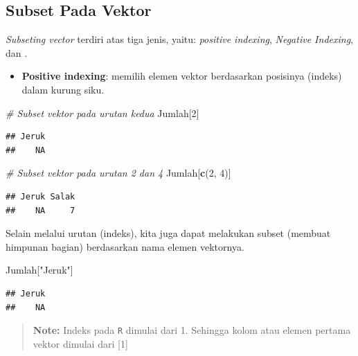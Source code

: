 \documentclass[]{book}
\newenvironment{Shaded}{\begin{snugshade}}{\end{snugshade}}
\newcommand{\KeywordTok}[1]{\textcolor[rgb]{0.13,0.29,0.53}{\textbf{#1}}}
\newcommand{\DecValTok}[1]{\textcolor[rgb]{0.00,0.00,0.81}{#1}}
\newcommand{\StringTok}[1]{\textcolor[rgb]{0.31,0.60,0.02}{#1}}
\newcommand{\CommentTok}[1]{\textcolor[rgb]{0.56,0.35,0.01}{\textit{#1}}}
\newcommand{\NormalTok}[1]{#1}
\providecommand{\tightlist}{%
  \setlength{\itemsep}{0pt}\setlength{\parskip}{0pt}}
\begin{document}
\subsection{Subset Pada Vektor}\label{subset-pada-vektor}

\emph{Subseting vector} terdiri atas tiga jenis, yaitu: \emph{positive
indexing}, \emph{Negative Indexing}, dan .

\begin{itemize}
\tightlist
\item
  \textbf{Positive indexing}: memilih elemen vektor berdasarkan
  posisinya (indeks) dalam kurung siku.
\end{itemize}

\begin{Shaded}
\begin{Highlighting}[]
\CommentTok{# Subset vektor pada urutan kedua}
\NormalTok{Jumlah[}\DecValTok{2}\NormalTok{]}
\end{Highlighting}
\end{Shaded}

\begin{verbatim}
## Jeruk 
##    NA
\end{verbatim}

\begin{Shaded}
\begin{Highlighting}[]
\CommentTok{# Subset vektor pada urutan 2 dan 4}
\NormalTok{Jumlah[}\KeywordTok{c}\NormalTok{(}\DecValTok{2}\NormalTok{, }\DecValTok{4}\NormalTok{)]}
\end{Highlighting}
\end{Shaded}

\begin{verbatim}
## Jeruk Salak 
##    NA     7
\end{verbatim}

Selain melalui urutan (indeks), kita juga dapat melakukan subset
(membuat himpunan bagian) berdasarkan nama elemen vektornya.

\begin{Shaded}
\begin{Highlighting}[]
\NormalTok{Jumlah[}\StringTok{"Jeruk"}\NormalTok{]}
\end{Highlighting}
\end{Shaded}

\begin{verbatim}
## Jeruk 
##    NA
\end{verbatim}

\begin{quote}
\textbf{Note: } Indeks pada \texttt{R} dimulai dari 1. Sehingga kolom
atau elemen pertama vektor dimulai dari {[}1{]}
\end{quote}
\end{document}
